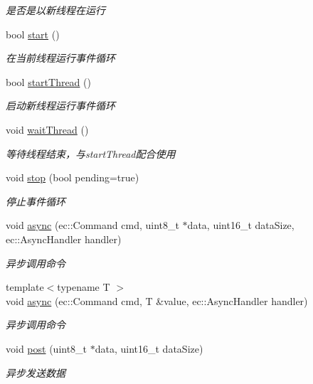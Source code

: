 \begin{DoxyCompactItemize}
\begin{DoxyCompactList}\small\item\em 是否是以新线程在运行 \end{DoxyCompactList}\item 
bool \hyperlink{classec_1_1Loop_aede057b26d3c5a5c54dabb953bb9945b}{start} ()
\begin{DoxyCompactList}\small\item\em 在当前线程运行事件循环 \end{DoxyCompactList}\item 
bool \hyperlink{classec_1_1Loop_aa673dc1821347b95f0c1fddb78db41e2}{start\-Thread} ()
\begin{DoxyCompactList}\small\item\em 启动新线程运行事件循环 \end{DoxyCompactList}\item 
void \hyperlink{classec_1_1Loop_a452a6746df86ca3f9e32cbbba8896968}{wait\-Thread} ()
\begin{DoxyCompactList}\small\item\em 等待线程结束，与start\-Thread配合使用 \end{DoxyCompactList}\item 
void \hyperlink{classec_1_1Loop_a9c8926512c35227aa01d1a23cec1fcdf}{stop} (bool pending=true)
\begin{DoxyCompactList}\small\item\em 停止事件循环 \end{DoxyCompactList}\item 
void \hyperlink{classec_1_1Loop_a9e0c3dfd61a2a909644654bb7fc452b9}{async} (ec\-::\-Command cmd, uint8\-\_\-t $\ast$data, uint16\-\_\-t data\-Size, ec\-::\-Async\-Handler handler)
\begin{DoxyCompactList}\small\item\em 异步调用命令 \end{DoxyCompactList}\item 
{\footnotesize template$<$typename T $>$ }\\void \hyperlink{classec_1_1Loop_ac817156aaff57dcb5068c4ca20536c5c}{async} (ec\-::\-Command cmd, T \&value, ec\-::\-Async\-Handler handler)
\begin{DoxyCompactList}\small\item\em 异步调用命令 \end{DoxyCompactList}\item 
void \hyperlink{classec_1_1Loop_a4f34cbbabe5c798b725a61670dd9d6a7}{post} (uint8\-\_\-t $\ast$data, uint16\-\_\-t data\-Size)
\begin{DoxyCompactList}\small\item\em 异步发送数据 \end{DoxyCompactList}\item 

\end{DoxyCompactItemize}
